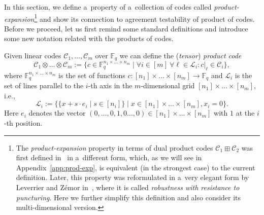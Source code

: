\documentclass[11pt]{article}
\theoremstyle{plain}
\theoremstyle{definition}
\theoremstyle{remark}
\newtheorem{remark}{Remark}
\newcommand{\FF}{\mathbb{F}}
\newcommand{\cA}{\mathcal{A}}
\newcommand{\cB}{\mathcal{B}}
\newcommand{\cC}{\mathcal{C}}
\newcommand{\cL}{\mathcal{L}}
\newcommand{\F}{\mathbb{F}}
\DeclareMathOperator{\im}{im}
\begin{document}

In this section, we define a~property of a~collection of codes called \emph{product-expansion}\footnote{The \emph{product-expansion} property in terms of dual product codes $\cC_1\boxplus\cC_2$ was first defined in~\cite{Panteleev&Kalachev:stoc2022} in a~different form, which, as we will see in Appendix~\ref{app:prod-exp}, is equivalent (in the strongest case) to the current definition. Later, this property was reformulated in a~very elegant form by Leverrier and Z{\'e}mor in~\cite{Leverrier:focs2022}, where it is called \emph{robustness with resistance to puncturing}. Here we further simplify this definition and also consider its multi-dimensional version.} and show its connection to agreement testability of product of codes. Before we proceed, let us first remind some standard definitions and introduce some new notation related with the products of codes.

Given linear codes $\cC_1,\dots,\cC_m$ over $\F_q$ we can define the (\emph{tensor}) \emph{product code} 
\[
\cC_1\otimes\dots\otimes\cC_m := \{c\in \F_q^{n_1\times\dots\times n_m} \mid \forall i\in [m]\ \forall \ell\in \cL_i\colon c|_\ell\in  \cC_i\},
\]
where $\F_q^{n_1\times\dots\times n_m}$ is the set of functions $c\colon[n_1]\times \dots\times [n_m] \to \F_q$  and $\cL_i$ is the set of  lines parallel to the $i$-th axis in the $m$-dimensional grid $[n_1]\times \dots\times [n_m]$, i.e., 
\[
\cL_i := \{\{x + s\cdot e_i \mid s \in [n_i] \} \mid x\in [n_1]\times \dots\times [n_m], x_i = 0 \}.
\]
Here $e_i$ denotes the vector $(0,\dots,0,1,0\dots,0) \in [n_1]\times \dots \times [n_m]$ with $1$ at the $i$-th position. 
\end{document}
